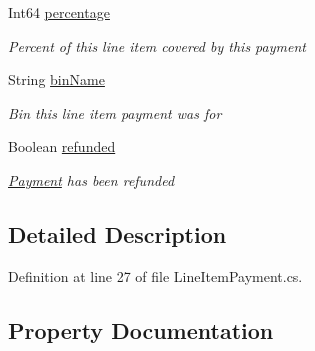 \begin{DoxyCompactItemize}
Int64 \hyperlink{classcom_1_1clover_1_1sdk_1_1v3_1_1payments_1_1_line_item_payment_afa610c11c1fb3a87628f4f74d98e864e}{percentage}
\begin{DoxyCompactList}\small\item\em Percent of this line item covered by this payment \end{DoxyCompactList}\item 
String \hyperlink{classcom_1_1clover_1_1sdk_1_1v3_1_1payments_1_1_line_item_payment_a8b329f3405745883d6a991441dd54d20}{bin\+Name}
\begin{DoxyCompactList}\small\item\em Bin this line item payment was for \end{DoxyCompactList}\item 
Boolean \hyperlink{classcom_1_1clover_1_1sdk_1_1v3_1_1payments_1_1_line_item_payment_af51ba6631bf7e29f9379566a7bf840b5}{refunded}
\begin{DoxyCompactList}\small\item\em \hyperlink{classcom_1_1clover_1_1sdk_1_1v3_1_1payments_1_1_payment}{Payment} has been refunded \end{DoxyCompactList}\end{DoxyCompactItemize}


\subsection{Detailed Description}


Definition at line 27 of file Line\+Item\+Payment.\+cs.



\subsection{Property Documentation}
\mbox{\label{classcom_1_1clover_1_1sdk_1_1v3_1_1payments_1_1_line_item_payment_a8b329f3405745883d6a991441dd54d20}} 

